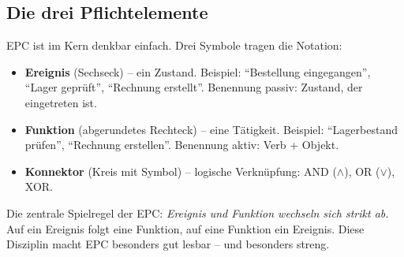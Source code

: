 \documentclass[11pt,a4paper,oneside]{article}
\newcommand{\fachbegriff}[1]{\textbf{#1}}
\begin{document}
\subsection{Die drei Pflichtelemente}

EPC ist im Kern denkbar einfach. Drei Symbole tragen die Notation:

\begin{itemize}
  \item \fachbegriff{Ereignis} (Sechseck) -- ein Zustand. Beispiel: ``Bestellung eingegangen'', ``Lager geprüft'', ``Rechnung erstellt''. Benennung passiv: Zustand, der eingetreten ist.
  \item \fachbegriff{Funktion} (abgerundetes Rechteck) -- eine Tätigkeit. Beispiel: ``Lagerbestand prüfen'', ``Rechnung erstellen''. Benennung aktiv: Verb + Objekt.
  \item \fachbegriff{Konnektor} (Kreis mit Symbol) -- logische Verknüpfung: AND ($\wedge$), OR ($\vee$), XOR.
\end{itemize}

Die zentrale Spielregel der EPC: \emph{Ereignis und Funktion wechseln sich strikt ab.} Auf ein Ereignis folgt eine Funktion, auf eine Funktion ein Ereignis. Diese Disziplin macht EPC besonders gut lesbar -- und besonders streng.
\end{document}
